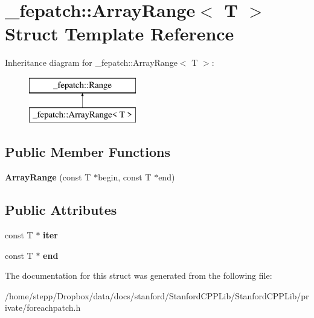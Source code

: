 \hypertarget{struct__fepatch_1_1ArrayRange}{}\section{\+\_\+fepatch\+:\+:Array\+Range$<$ T $>$ Struct Template Reference}
\label{struct__fepatch_1_1ArrayRange}
Inheritance diagram for \+\_\+fepatch\+:\+:Array\+Range$<$ T $>$\+:\begin{figure}[H]
\begin{center}
\leavevmode
\includegraphics[height=2.000000cm]{struct__fepatch_1_1ArrayRange}
\end{center}
\end{figure}
\subsection*{Public Member Functions}
\begin{DoxyCompactItemize}
\item 
\mbox{\label{struct__fepatch_1_1ArrayRange_aa58d3f062a5274de97710759c795f59d}} 
{\bfseries Array\+Range} (const T $\ast$begin, const T $\ast$end)
\end{DoxyCompactItemize}
\subsection*{Public Attributes}
\begin{DoxyCompactItemize}
\item 
\mbox{\label{struct__fepatch_1_1ArrayRange_a639830f6e4101b8ec39f9b183b596807}} 
const T $\ast$ {\bfseries iter}
\item 
\mbox{\label{struct__fepatch_1_1ArrayRange_ac86e75321e8ca0b77f27f13a9e883a3b}} 
const T $\ast$ {\bfseries end}
\end{DoxyCompactItemize}


The documentation for this struct was generated from the following file\+:\begin{DoxyCompactItemize}
\item 
/home/stepp/\+Dropbox/data/docs/stanford/\+Stanford\+C\+P\+P\+Lib/\+Stanford\+C\+P\+P\+Lib/private/foreachpatch.\+h\end{DoxyCompactItemize}
